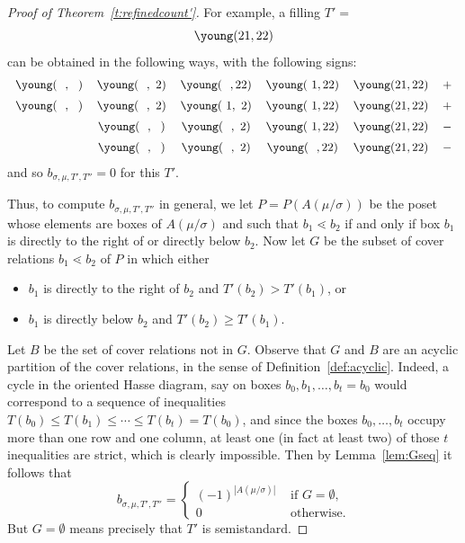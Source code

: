 \begin{proof}[Proof of Theorem~\ref{t:refinedcount'}]
For example, a filling $T' =$ 
\[
\young(21,22)
\] 
can be obtained in the following ways, with the following signs:
\[
\begin{tabular}{cccccr}
$\young(\ \ ,\ \ )$ & $ \young(\ \ ,\ 2)$ & $ \young(\ \ ,22)$ & $\young(\ 1,22)$ & $\young(21,22)$ &$+$\\[0.2cm]
$\young(\ \ ,\ \ )$ & $ \young(\ \ ,\ 2)$ & $ \young(\ 1,\ 2)$ & $\young(\ 1,22)$ & $\young(21,22)$ & $+$\\[0.2cm]
&$\young(\ \ ,\ \ )$ & $ \young(\ \ ,\ 2)$ & $ \young(\ 1,22)$ & $\young(21,22)$ &$-$\\[0.2cm]
&$\young(\ \ ,\ \ ) $ & $ \young(\ \ ,\ 2)$ & $ \young(\ \ ,22)$ & $\young(21,22)$ & $-$
\end{tabular}
\]
and so $b_{\sigma,\mu,T',T''} = 0$ for this $T'$.

Thus, to compute $b_{\sigma,\mu,T',T''}$ in general, we let $P=P(A(\mu/\sigma))$ be the poset whose elements are boxes of $A(\mu/\sigma)$ and such that $b_1\lessdot b_2$ if and only if box $b_1$ is directly to the right of or directly below $b_2$. Now let $G$ be the subset of cover relations $b_1\lessdot b_2$ of $P$ in which either
\begin{itemize}
\item $b_1$ is directly to the right of $b_2$ and $T'(b_2) > T'(b_1)$, or
\item $b_1$ is directly below $b_2$ and $T'(b_2) \ge T'(b_1)$.
\end{itemize}

Let $B$ be the set of cover relations not in $G$. Observe that $G$ and $B$ are an acyclic partition of the cover relations, in the sense of Definition~\ref{def:acyclic}. Indeed, a cycle in the oriented Hasse diagram, say on boxes $b_0,b_1,\ldots,b_t=b_0$ would correspond to a sequence of inequalities $T(b_0) \le T(b_1) \le \cdots \le T(b_t) = T(b_0)$, and since the boxes $b_0,\ldots,b_t$ occupy more than one row and one column, at least one (in fact at least two) of those $t$ inequalities are strict, which is clearly impossible.
Then by Lemma~\ref{lem:Gseq} it follows that 
\[
b_{\sigma,\mu,T',T''} = \begin{cases}
(-1)^{|A(\mu/\sigma)|} &\text{ if }G=\emptyset, \\ 
0 & \text{ otherwise.}
\end{cases}
\]
But $G=\emptyset$ means precisely that $T'$ is semistandard. 
\end{proof}
